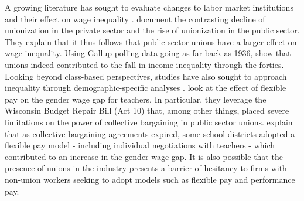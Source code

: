 \documentclass[11pt]{article}
\begin{document}
A growing literature has sought to evaluate changes to labor market institutions and their effect on wage inequality \citep[see, for example,][]{fll2021, fhkn2021, clr2020, ams2016, ffl2009, dfl1996}. \citet{clr2020} document the contrasting decline of unionization in the private sector and the rise of unionization in the public sector. They explain that it thus follows that public sector unions have a larger effect on wage inequality. Using Gallup polling data going as far back as 1936, \citet{fhkn2021} show that unions indeed contributed to the fall in income inequality through the forties. Looking beyond class-based perspectives, studies have also sought to approach inequality through demographic-specific analyses \citep[see, for example,][]{biasisarsons2020, blaukahn1996}. \citet{biasisarsons2020} look at the effect of flexible pay on the gender wage gap for teachers. In particular, they leverage the Wisconsin Budget Repair Bill (Act 10) that, among other things, placed severe limitations on the power of collective bargaining in public sector unions. \citet{biasisarsons2020} explain that as collective bargaining agreements expired, some school districts adopted a flexible pay model - including individual negotiations with teachers - which contributed to an increase in the gender wage gap. It is also possible that the presence of unions in the industry presents a barrier of hesitancy to firms with non-union workers seeking to adopt models such as flexible pay and performance pay.
\end{document}
